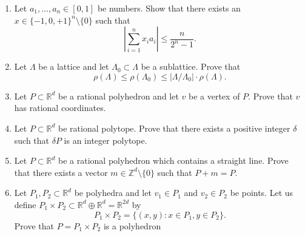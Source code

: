 \documentclass[11pt,a4paper]{article}
\renewcommand{\leq}{\leqslant}
\begin{document}
\begin{enumerate}
  
  \item Let $a_1 ,\hdots,a_n∈ [0,1]$ be numbers. Show that there exists an $x \in \{-1, 0, +1\}^n \setminus \{0\}$ such that $$\left\vert \displaystyle\sum_{i =1}^n x_i a_i \right\vert \leq \frac{n}{2^n -1}.$$

  \item Let $Λ$ be a lattice and let $Λ_0 ⊂ Λ$ be a sublattice. Prove that $$ρ(Λ) ≤ ρ(Λ_0) ≤ |Λ/Λ_0| \cdot ρ(Λ).$$

  \item Let $P ⊂ \mathbb{R}^d$ be a rational polyhedron and let $v$ be a vertex of $P$. Prove that $v$ has rational coordinates.

  \item Let $P ⊂ \mathbb{R}^d$ be rational polytope. Prove that there exists a positive integer $δ$ such that $δP$ is an integer polytope.

  \item Let $P ⊂ \mathbb{R}^d$ be a rational polyhedron which contains a straight line. Prove that there exists a vector $m ∈ \mathbb{Z}^d \setminus \{0\}$ such that $P + m = P$.

  \item Let $P_1,P_2 ⊂ \mathbb{R}^d$ be polyhedra and let $v_1 ∈ P_1$ and $v_2 ∈ P_2$ be points. Let us define $P_1 × P_2 ⊂ \mathbb{R}^d ⊕ \mathbb{R}^d = \mathbb{R}^{2d}$ by
$$P_1×P_2= \{(x,y): x∈P_1,y∈P_2\}.$$ 
Prove that $P = P_1 × P_2$ is a polyhedron
      
      

\end{enumerate}


%
%


 
\end{document}
